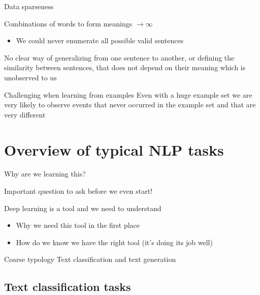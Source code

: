 \documentclass[12pt,aspectratio=169,handout]{beamer}
\begin{document}
\begin{frame}{Data sparseness}
	
	Combinations of words to form meanings $\to \infty$
	
	\begin{itemize}
		\item We could never enumerate all possible valid sentences
	\end{itemize}
	
	
	No clear way of generalizing from one sentence to another, or defining the similarity between sentences, that does not depend on their meaning which is unobserved to us
	
	
	\begin{block}{Challenging when learning from examples}
		Even with a huge example set we are very likely to observe events that never occurred in the example set and that are very different
	\end{block}
	
\end{frame}




\section{Overview of typical NLP tasks}


\begin{frame}{Why are we learning this?}
	
Important question to ask before we even start!

\bigskip

Deep learning is a tool and we need to understand

\begin{itemize}
	\item Why we need this tool in the first place
	\item How do we know we have the right tool (it's doing its job well)
\end{itemize}


\end{frame}


\begin{frame}{Coarse typology}
Text classification and text generation
\end{frame}

\subsection{Text classification tasks}
\end{document}
